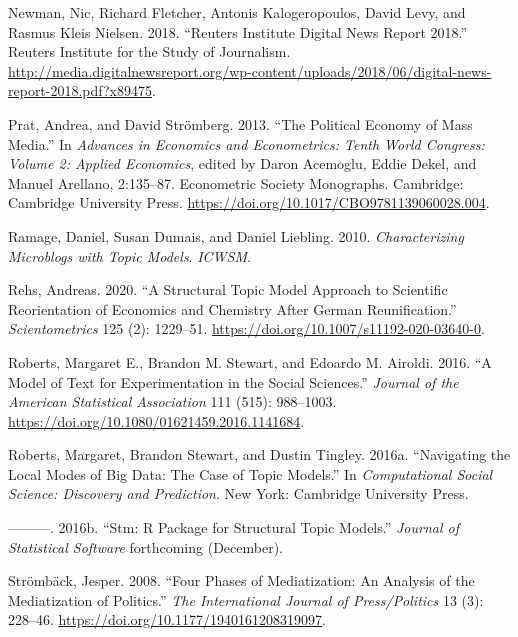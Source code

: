 \documentclass[
  12pt,
]{article}
\newlength{\cslhangindent}
\newlength{\cslentryspacingunit} %
\newenvironment{CSLReferences}[2] %
 {%
  \setlength{\parindent}{0pt}
  \ifodd #1
  \let\oldpar\par
  \def\par{\hangindent=\cslhangindent\oldpar}
  \fi
  \setlength{\parskip}{#2\cslentryspacingunit}
 }%
 {}
\begin{document}
\begin{CSLReferences}{1}{0}
\leavevmode{}%
Newman, Nic, Richard Fletcher, Antonis Kalogeropoulos, David Levy, and
Rasmus Kleis Nielsen. 2018. {``Reuters {Institute Digital News Report}
2018.''} {Reuters Institute for the Study of Journalism}.
\url{http://media.digitalnewsreport.org/wp-content/uploads/2018/06/digital-news-report-2018.pdf?x89475}.

\leavevmode{}%
Prat, Andrea, and David Strömberg. 2013. {``The {Political Economy} of
{Mass Media}.''} In \emph{Advances in {Economics} and {Econometrics}:
{Tenth World Congress}: {Volume} 2: {Applied Economics}}, edited by
Daron Acemoglu, Eddie Dekel, and Manuel Arellano, 2:135--87. Econometric
{Society Monographs}. {Cambridge}: {Cambridge University Press}.
\url{https://doi.org/10.1017/CBO9781139060028.004}.

\leavevmode{}%
Ramage, Daniel, Susan Dumais, and Daniel Liebling. 2010.
\emph{Characterizing {Microblogs} with {Topic Models}}. \emph{ICWSM}.

\leavevmode{}%
Rehs, Andreas. 2020. {``A Structural Topic Model Approach to Scientific
Reorientation of Economics and Chemistry After {German}
Reunification.''} \emph{Scientometrics} 125 (2): 1229--51.
\url{https://doi.org/10.1007/s11192-020-03640-0}.

\leavevmode{}%
Roberts, Margaret E., Brandon M. Stewart, and Edoardo M. Airoldi. 2016.
{``A {Model} of {Text} for {Experimentation} in the {Social
Sciences}.''} \emph{Journal of the American Statistical Association} 111
(515): 988--1003. \url{https://doi.org/10.1080/01621459.2016.1141684}.

\leavevmode{}%
Roberts, Margaret, Brandon Stewart, and Dustin Tingley. 2016a.
{``Navigating the {Local Modes} of {Big Data}: {The Case} of {Topic
Models}.''} In \emph{Computational {Social Science}: {Discovery} and
{Prediction}}. {New York}: {Cambridge University Press}.

\leavevmode{}%
---------. 2016b. {``Stm: {R Package} for {Structural Topic Models}.''}
\emph{Journal of Statistical Software} forthcoming (December).

\leavevmode{}%
Strömbäck, Jesper. 2008. {``Four {Phases} of {Mediatization}: {An
Analysis} of the {Mediatization} of {Politics}.''} \emph{The
International Journal of Press/Politics} 13 (3): 228--46.
\url{https://doi.org/10.1177/1940161208319097}.


\end{CSLReferences}
\end{document}
